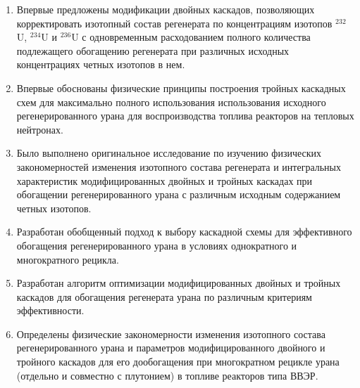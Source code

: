 {\novelty}
\begin{enumerate}
  \item Впервые предложены модификации двойных каскадов, позволяющих корректировать
  изотопный состав регенерата по концентрациям изотопов $^{232}$U, $^{234}$U и $^{236}$U с одновременным расходованием полного количества подлежащего обогащению регенерата при различных исходных концентрациях четных изотопов в нем.
  \item Впервые обоснованы физические принципы построения тройных каскадных схем для максимально полного использования использования исходного регенерированного урана для воспроизводства топлива реакторов на тепловых нейтронах.
  \item Было выполнено оригинальное исследование по изучению физических закономерностей изменения изотопного состава регенерата и интегральных характеристик модифицированных двойных и тройных каскадах при обогащении регенерированного урана с различным исходным содержанием четных изотопов.
  \item Разработан обобщенный подход к выбору каскадной схемы для эффективного обогащения регенерированного урана в условиях однократного и многократного рецикла.
  \item Разработан алгоритм оптимизации модифицированных двойных и тройных каскадов для обогащения регенерата урана по различным критериям
  эффективности.
  \item Определены физические закономерности изменения изотопного состава регенерированного урана и параметров модифицированного двойного и тройного каскадов для его дообогащения при многократном рецикле урана (отдельно и совместно с плутонием) в топливе реакторов типа ВВЭР.
\end{enumerate}

